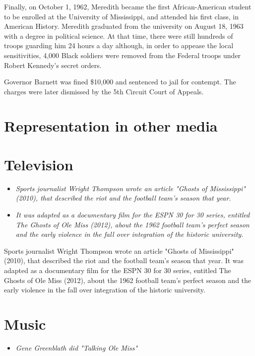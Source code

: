 Finally, on October 1, 1962, Meredith became the first African-American
student to be enrolled at the University of Mississippi, and attended
his first class, in American History. Meredith graduated from the
university on August 18, 1963 with a degree in political science. At
that time, there were still hundreds of troops guarding him 24 hours a
day although, in order to appease the local sensitivities, 4,000 Black
soldiers were removed from the Federal troops under Robert Kennedy's
secret orders.

Governor Barnett was fined \$10,000 and sentenced to jail for contempt.
The charges were later dismissed by the 5th Circuit Court of Appeals.

\section{Representation in other
media}\label{representation-in-other-media}

\section{Television}\label{television}

\begin{itemize}
\item
  \emph{Sports journalist Wright Thompson wrote an article "Ghosts of
  Mississippi" (2010), that described the riot and the football team's
  season that year.}
\item
  \emph{It was adapted as a documentary film for the ESPN 30 for 30
  series, entitled The Ghosts of Ole Miss (2012), about the 1962
  football team's perfect season and the early violence in the fall over
  integration of the historic university.}
\end{itemize}

Sports journalist Wright Thompson wrote an article "Ghosts of
Mississippi" (2010), that described the riot and the football team's
season that year. It was adapted as a documentary film for the ESPN 30
for 30 series, entitled The Ghosts of Ole Miss (2012), about the 1962
football team's perfect season and the early violence in the fall over
integration of the historic university.

\section{Music}\label{music}

\begin{itemize}
\item
  \emph{Gene Greenblath did "Talking Ole Miss"}
\end{itemize}


